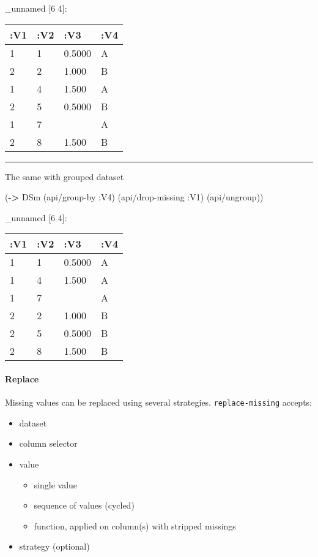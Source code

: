 \documentclass[]{article}
\newenvironment{Shaded}{\begin{snugshade}}{\end{snugshade}}
\newcommand{\KeywordTok}[1]{\textcolor[rgb]{0.13,0.29,0.53}{\textbf{#1}}}
\newcommand{\AttributeTok}[1]{\textcolor[rgb]{0.77,0.63,0.00}{#1}}
\newcommand{\NormalTok}[1]{#1}
\providecommand{\tightlist}{%
  \setlength{\itemsep}{0pt}\setlength{\parskip}{0pt}}
\let\oldparagraph\paragraph
\renewcommand{\paragraph}[1]{\oldparagraph{#1}\mbox{}}
\begin{document}
\_unnamed {[}6 4{]}:

\begin{longtable}[]{@{}llll@{}}
\toprule
:V1 & :V2 & :V3 & :V4\tabularnewline
\midrule
\endhead
1 & 1 & 0.5000 & A\tabularnewline
2 & 2 & 1.000 & B\tabularnewline
1 & 4 & 1.500 & A\tabularnewline
2 & 5 & 0.5000 & B\tabularnewline
1 & 7 & & A\tabularnewline
2 & 8 & 1.500 & B\tabularnewline
\bottomrule
\end{longtable}

\begin{center}\rule{0.5\linewidth}{0.5pt}\end{center}

The same with grouped dataset

\begin{Shaded}
\begin{Highlighting}[]
\NormalTok{(}\KeywordTok{->}\NormalTok{ DSm}
\NormalTok{    (api/group-by }\AttributeTok{:V4}\NormalTok{)}
\NormalTok{    (api/drop-missing }\AttributeTok{:V1}\NormalTok{)}
\NormalTok{    (api/ungroup))}
\end{Highlighting}
\end{Shaded}

\_unnamed {[}6 4{]}:

\begin{longtable}[]{@{}llll@{}}
\toprule
:V1 & :V2 & :V3 & :V4\tabularnewline
\midrule
\endhead
1 & 1 & 0.5000 & A\tabularnewline
1 & 4 & 1.500 & A\tabularnewline
1 & 7 & & A\tabularnewline
2 & 2 & 1.000 & B\tabularnewline
2 & 5 & 0.5000 & B\tabularnewline
2 & 8 & 1.500 & B\tabularnewline
\bottomrule
\end{longtable}

\paragraph{Replace}\label{replace}

Missing values can be replaced using several strategies.
\texttt{replace-missing} accepts:

\begin{itemize}
\tightlist
\item
  dataset
\item
  column selector
\item
  value

  \begin{itemize}
  \tightlist
  \item
    single value
  \item
    sequence of values (cycled)
  \item
    function, applied on column(s) with stripped missings
  \end{itemize}
\item
  strategy (optional)
\end{itemize}
\end{document}
